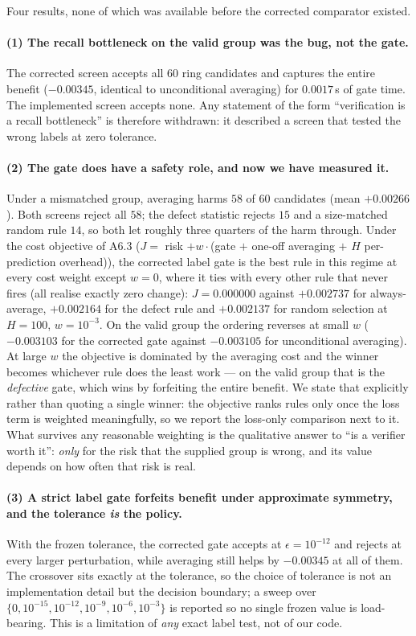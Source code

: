 \documentclass[11pt]{article}
\begin{document}
Four results, none of which was available before the corrected comparator existed.

\paragraph{(1) The recall bottleneck on the valid group was the bug, not the gate.}
The corrected screen accepts all $60$ ring candidates and captures the entire benefit
($-0.00345$, identical to unconditional averaging) for $0.0017$\,s of gate time. The
implemented screen accepts none. Any statement of the form ``verification is a recall
bottleneck'' is therefore withdrawn: it described a screen that tested the wrong labels at
zero tolerance.

\paragraph{(2) The gate does have a safety role, and now we have measured it.}
Under a mismatched group, averaging harms $58$ of $60$ candidates (mean $+0.00266$). Both
screens reject all $58$; the defect statistic rejects $15$ and a size-matched random rule
$14$, so both let roughly three quarters of the harm through. Under the cost objective of
A6.3 ($J = $ risk $+ w\cdot$(gate $+$ one-off averaging $+$ $H$ per-prediction overhead)),
the corrected label gate is the best rule in this regime at every cost weight except $w{=}0$,
where it ties with every other rule that never fires (all realise exactly zero change):
$J{=}0.000000$ against $+0.002737$ for always-average, $+0.002164$ for the defect rule and
$+0.002137$ for random selection at $H{=}100$, $w{=}10^{-3}$. On the valid group the ordering
reverses at small $w$ ($-0.003103$ for the corrected gate against $-0.003105$ for unconditional
averaging). At large $w$ the objective is dominated by the averaging cost and the winner becomes
whichever rule does the least work --- on the valid group that is the \emph{defective} gate, which
wins by forfeiting the entire benefit. We state that explicitly rather than quoting a single
winner: the objective ranks rules only once the loss term is weighted meaningfully, so we report
the loss-only comparison next to it. What survives any reasonable weighting is the qualitative
answer to ``is a verifier worth it'': \emph{only} for the risk that the supplied group is wrong,
and its value depends on how often that risk is real.

\paragraph{(3) A strict label gate forfeits benefit under approximate symmetry, and the
tolerance \emph{is} the policy.} With the frozen tolerance, the corrected gate accepts at
$\epsilon = 10^{-12}$ and rejects at every larger perturbation, while averaging still helps by
$-0.00345$ at all of them. The crossover sits exactly at the tolerance, so the choice of
tolerance is not an implementation detail but the decision boundary; a sweep over
$\{0,10^{-15},10^{-12},10^{-9},10^{-6},10^{-3}\}$ is reported so no single frozen value is
load-bearing. This is a limitation of \emph{any} exact label test, not of our code.
\end{document}
